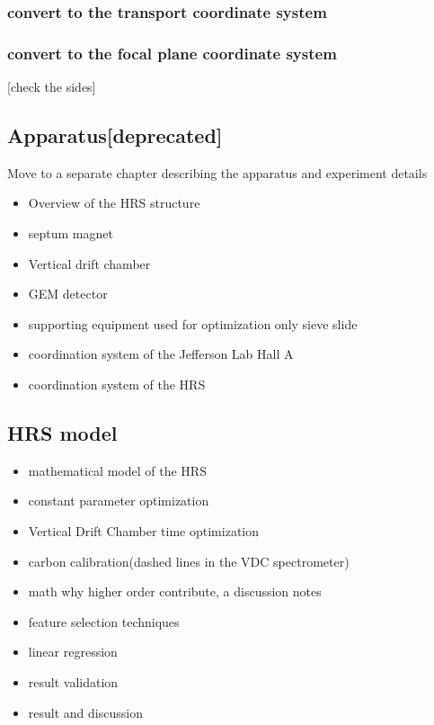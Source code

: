 \subsubsection{convert to the transport coordinate system}
\subsubsection{convert to the focal plane coordinate system}

[check the sides]

\subsection{Apparatus[deprecated]}

Move to a separate chapter describing the apparatus and experiment details

\begin{itemize}
    \item Overview of the HRS structure
    \item septum magnet 
    \item Vertical drift chamber 
    \item GEM detector
    \item supporting equipment used for optimization only sieve slide

    \item coordination system of the Jefferson Lab Hall A
    \item coordination system of the HRS
\end{itemize}


\subsection{HRS model}

\begin{itemize}
    \item mathematical model of the HRS
    \item constant parameter optimization
    \item Vertical Drift Chamber time optimization
    \item carbon calibration(dashed lines in the VDC spectrometer)
    \item math why higher order contribute, a discussion notes
    \item feature selection techniques
    \item linear regression
    \item result validation
    \item result and discussion
\end{itemize}
